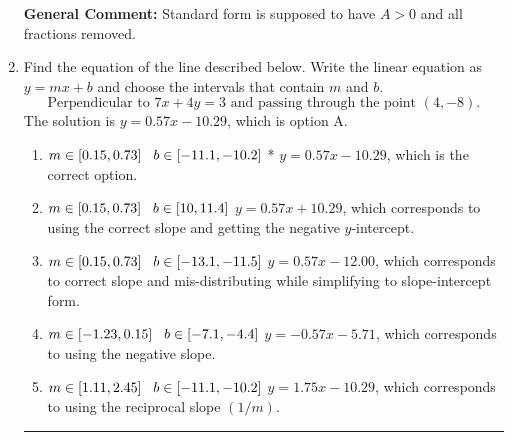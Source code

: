 \documentclass{extbook}[14pt]
\newcommand{\litem}[1]{\item #1

\rule{\textwidth}{0.4pt}}
\begin{document}
\begin{enumerate}
{\textbf{General Comment:} Standard form is supposed to have $A > 0$ and all fractions removed.
}
\litem{
Find the equation of the line described below. Write the linear equation as $ y=mx+b $ and choose the intervals that contain $m$ and $b$.
\[ \text{Perpendicular to } 7 x + 4 y = 3 \text{ and passing through the point } (4, -8). \]
The solution is \( y = 0.57x - 10.29 \), which is option A.\begin{enumerate}[label=\Alph*.]
\item \( m \in [0.15, 0.73] \hspace*{3mm} b \in [-11.1, -10.2] \)
* $y = 0.57x - 10.29$, which is the correct option.
\item \( m \in [0.15, 0.73] \hspace*{3mm} b \in [10, 11.4] \)
 $y = 0.57x + 10.29$, which corresponds to using the correct slope and getting the negative $y$-intercept.
\item \( m \in [0.15, 0.73] \hspace*{3mm} b \in [-13.1, -11.5] \)
 $y = 0.57x - 12.00$, which corresponds to correct slope and mis-distributing while simplifying to slope-intercept form.
\item \( m \in [-1.23, 0.15] \hspace*{3mm} b \in [-7.1, -4.4] \)
 $y = -0.57x - 5.71$, which corresponds to using the negative slope.
\item \( m \in [1.11, 2.45] \hspace*{3mm} b \in [-11.1, -10.2] \)
 $y = 1.75x - 10.29$, which corresponds to using the reciprocal slope $(1/m)$.
\end{enumerate}

}
\end{enumerate}
\end{document}
